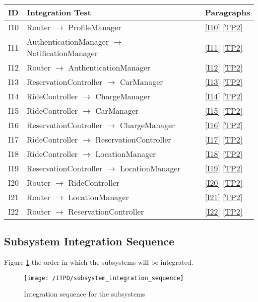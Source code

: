 	\begin{center}
		\vspace{0.6cm}
		\begin{tabular}{|l|l|l|}
			\hline
			\textbf{ID} & \textbf{Integration Test} & \textbf{Paragraphs} \bigstrut \\\hline
			\hline
			I10 & Router \ensuremath{\rightarrow} ProfileManager & \ref{I10}  \ref{TP2} \bigstrut \\\hline
			I11 & AuthenticationManager \ensuremath{\rightarrow} NotificationManager & \ref{I11}  \ref{TP2} \bigstrut \\\hline
			I12 & Router \ensuremath{\rightarrow} AuthenticationManager & \ref{I12}  \ref{TP2} \bigstrut \\\hline
			I13 & ReservationController \ensuremath{\rightarrow} CarManager & \ref{I13}  \ref{TP2} \bigstrut \\\hline
			I14 & RideController \ensuremath{\rightarrow} ChargeManager & \ref{I14}  \ref{TP2} \bigstrut \\\hline
			I15 & RideController \ensuremath{\rightarrow} CarManager & \ref{I15}  \ref{TP2} \bigstrut \\\hline
			I16 & ReservationController \ensuremath{\rightarrow} ChargeManager & \ref{I16}  \ref{TP2} \bigstrut \\\hline
			I17 & RideController \ensuremath{\rightarrow} ReservationController & \ref{I17}  \ref{TP2} \bigstrut \\\hline
			I18 & RideController \ensuremath{\rightarrow} LocationManager & \ref{I18}  \ref{TP2} \bigstrut \\\hline
			I19 & ReservationController \ensuremath{\rightarrow} LocationManager & \ref{I19}  \ref{TP2} \bigstrut \\\hline
			I20 & Router \ensuremath{\rightarrow} RideController & \ref{I20}  \ref{TP2} \bigstrut \\\hline
			I21 & Router \ensuremath{\rightarrow} LocationManager & \ref{I21}  \ref{TP2} \bigstrut \\\hline
			I22 & Router \ensuremath{\rightarrow} ReservationController & \ref{I22}  \ref{TP2} \bigstrut \\\hline
		\end{tabular}
	\end{center}

	\newpage
	\subsection{Subsystem Integration Sequence}
	Figure \ref{fig:subsystem_integration_sequence} the order in which the subsystems will be integrated.

	\begin{figure}[!ht]
	  \centering
	  \vspace{0.2cm}
	  \texttt{[image: /ITPD/subsystem\_integration\_sequence]}\\
	  \vspace{0.2cm}
	  \caption{Integration sequence for the subsystems} 
	  \label{fig:subsystem_integration_sequence} 
	\end{figure}
